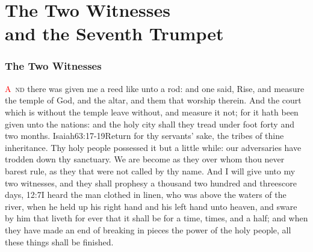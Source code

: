 
\chapter{The Two Witnesses \\and the Seventh Trumpet}
\subsection*{The Two Witnesses}
\lettrine[lines=3,slope=0.5em]{\textcolor{red}{A}}{\ nd} there was given me a reed like unto a rod:%
 and one said, Rise, and measure the temple of God, and the altar, and them that worship therein. 
 And the court which is without the temple leave without, and measure it not; for it hath been given unto the nations: and the holy city shall they tread under foot forty and two months.%
					{Isaiah}{63:17-19}{Return for thy servants’ sake, the tribes of thine inheritance. Thy holy people possessed it but a little while: our adversaries have trodden down thy sanctuary. We are become as they over whom thou never barest rule, as they that were not called by thy name.} %
 And I will give unto my two witnesses, and they shall prophesy a thousand two hundred and threescore days,%
					{12:7}{I heard the man clothed in linen, who was above the waters of the river, when he held up his right hand and his left hand unto heaven, and sware by him that liveth for ever that it shall be for a time, times, and a half; and when they have made an end of breaking in pieces the power of the holy people, all these things shall be finished.}

